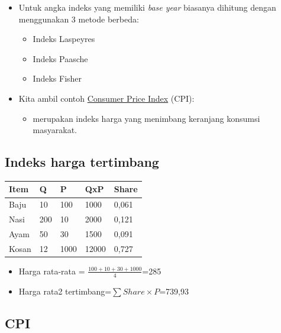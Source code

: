\documentclass[
  letterpaper,
  DIV=11,
  numbers=noendperiod]{scrartcl}
\providecommand{\tightlist}{%
  \setlength{\itemsep}{0pt}\setlength{\parskip}{0pt}}\usepackage{longtable,booktabs,array}
\begin{document}
\begin{itemize}
\item
  Untuk angka indeks yang memiliki \emph{base year} biasanya dihitung
  dengan menggunakan 3 metode berbeda:

  \begin{itemize}
  \item
    Indeks Laspeyres
  \item
    Indeks Paasche
  \item
    Indeks Fisher
  \end{itemize}
\item
  Kita ambil contoh
  \href{https://www.bps.go.id/id/statistics-table/2/MTcwOSMy/indeks-harga-konsumen-90-kota--umum-.html}{Consumer
  Price Index} (CPI):

  \begin{itemize}
  \tightlist
  \item
    merupakan indeks harga yang menimbang keranjang konsumsi masyarakat.
  \end{itemize}
\end{itemize}

\subsection{Indeks harga tertimbang}\label{indeks-harga-tertimbang}

\begin{longtable}[]{@{}lllll@{}}
\toprule\noalign{}
Item & Q & P & QxP & Share \\
\midrule\noalign{}
\endhead
\bottomrule\noalign{}
\endlastfoot
Baju & 10 & 100 & 1000 & 0,061 \\
Nasi & 200 & 10 & 2000 & 0,121 \\
Ayam & 50 & 30 & 1500 & 0,091 \\
Kosan & 12 & 1000 & 12000 & 0,727 \\
\end{longtable}

\begin{itemize}
\item
  Harga rata-rata = \(\frac{100+10+30+1000}{4}\)=285
\item
  Harga rata2 tertimbang=\(\sum Share \times P\)=739,93
\end{itemize}

\subsection{CPI}\label{cpi}
\end{document}
